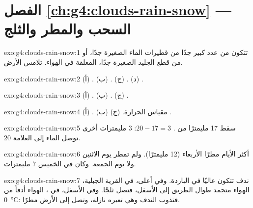 \section*{الفصل \ref{ch:g4:clouds-rain-snow} --- السحب والمطر والثلج}

\begin{solution}{exo:g4:clouds-rain-snow:1}
تتكون  من عدد كبير جدًا من قطيرات الماء الصغيرة جدًا، أو من قطع
الجليد الصغيرة جدًا، المعلقة في الهواء.   تلامس الأرض.
\end{solution}

\begin{solution}{exo:g4:clouds-rain-snow:2}
(أ) . (ب) . (ج) . (د) .
\end{solution}

\begin{solution}{exo:g4:clouds-rain-snow:3}
(أ) . (ب) . (ج) .
\end{solution}

\begin{solution}{exo:g4:clouds-rain-snow:4}
(أ) . (ب) مقياس الحرارة. (ج) .
\end{solution}

\begin{solution}{exo:g4:clouds-rain-snow:5}
سقط 17 مليمترًا من . $20 - 17 = 3$: 3 مليمترات أخرى
توصل الماء إلى العلامة 20.
\end{solution}

\begin{solution}{exo:g4:clouds-rain-snow:6}
أكثر الأيام مطرًا الأربعاء (12 مليمترًا). ولم تمطر يوم الاثنين
ولا يوم الجمعة. وكان في الخميس 7 مليمترات.
\end{solution}

\begin{solution}{exo:g4:clouds-rain-snow:7}
ندف  تتكون عاليًا في  الباردة. وفي أعلى، في القرية الجبلية،
الهواء متجمد طوال الطريق إلى الأسفل، فتصل ثلجًا. وفي الأسفل، في ،
الهواء أدفأ من \SI{0}{\celsius}: فتذوب الندف وهي تعبره نازلة،
وتصل إلى الأرض مطرًا.
\end{solution}

